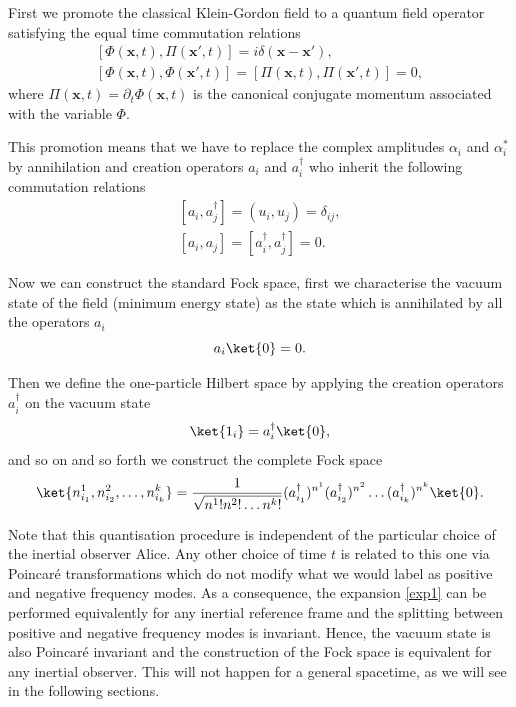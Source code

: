 First we promote the classical Klein-Gordon field to a quantum field operator satisfying the equal time commutation relations
\begin{equation}
\begin{array}{c}
\left[\Phi(\bm x,t),\Pi(\bm x',t)\right]=i\delta(\bm x-\bm x'),\\[3mm]
\left[\Phi(\bm x,t),\Phi(\bm x',t)\right]=\left[\Pi(\bm x,t),\Pi(\bm x',t)\right]=0,
\end{array}
\end{equation}
where $\Pi(\bm x,t)=\partial_t \Phi(\bm x,t)$ is the canonical conjugate momentum associated with the variable $\Phi$.

This promotion means that we have to replace the complex amplitudes $\alpha_i$ and $\alpha_i^*$ by annihilation and creation operators $a_i$ and $a_i^\dagger$ who inherit the following commutation relations
\begin{equation}
\begin{array}{c}
[a_i,a^\dagger_j]=(u_i,u_j)=\delta_{ij},\\[3mm]
[a_i,a_j]=[a^\dagger_i,a^\dagger_j]=0.
\end{array}
\end{equation}

Now we can construct the standard Fock space, first we characterise the vacuum state of the field (minimum energy state) as the state which is annihilated by all the operators $a_i$
\begin{equation}
a_i\ket{0}=0.
\end{equation}

Then we define the one-particle Hilbert space by applying the creation operators $a_i^\dagger$ on the vacuum state
\begin{equation}
\ket{1_i}=a^\dagger_i\ket{0},
\end{equation}
and so on and so forth we construct the complete Fock space
\begin{equation}
\ket{n^1_{i_1},n^2_{i_2},\dots,n^k_{i_k}}=\frac{1}{\sqrt{n^1!n^2!\dots n^k!}} (a^\dagger_{i_1})^{n^1}(a^\dagger_{i_2})^{n^2}\dots(a^\dagger_{i_k})^{n^k}\ket{0}.
\end{equation}

Note that this quantisation procedure is independent of the particular choice of the inertial observer Alice. Any other choice of time $t$ is related to this one via Poincar\'e transformations which do not modify what we would label as positive and negative frequency modes. As a consequence, the expansion \eqref{exp1} can be performed equivalently for any inertial reference frame and the splitting between positive and negative frequency modes is invariant. Hence, the vacuum state is also Poincar\'e invariant and the construction of the Fock space is equivalent for any inertial observer. This will not happen for a general spacetime, as we will see in the following sections.

